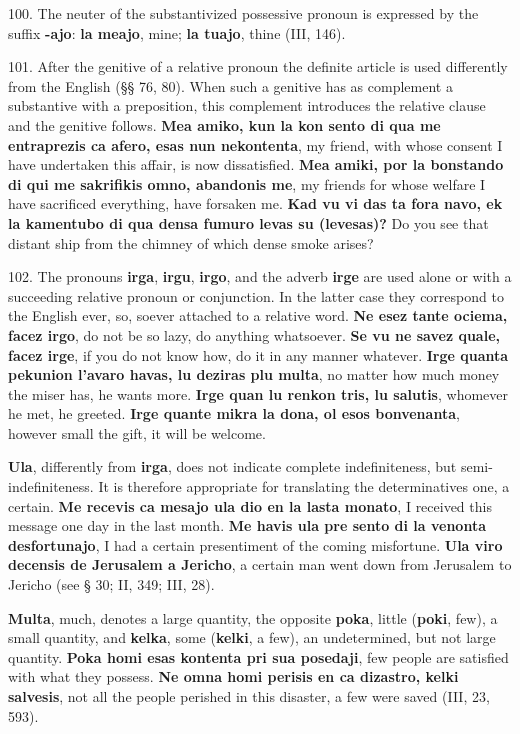 100. The neuter of the substantivized possessive pronoun is expressed by the suffix \textbf{-ajo}: \textbf{la meajo}, mine; \textbf{la tuajo}, thine (III, 146). 

101. After the genitive of a relative pronoun the definite article is used differently from the English (§§ 76, 80). When such a genitive has as complement a substantive with a preposition, this complement introduces the relative clause and the genitive follows. \textbf{Mea amiko, kun la kon sento di qua me entraprezis ca afero, esas nun nekontenta}, my friend, with whose consent I have undertaken this affair, is now dissatisfied. \textbf{Mea amiki, por la bonstando di qui me sakrifikis omno, abandonis me}, my friends for whose welfare I have sacrificed everything, have forsaken me. \textbf{Kad vu vi das ta fora navo, ek la kamentubo di qua densa fumuro levas su (levesas)?} Do you see that distant ship from the chimney of which dense smoke arises? 

102. The pronouns \textbf{irga}, \textbf{irgu}, \textbf{irgo}, and the adverb \textbf{irge} are used alone or with a succeeding relative pronoun or conjunction. In the latter case they correspond to the English ever, so, soever attached to a relative word. \textbf{Ne esez tante ociema, facez irgo}, do not be so lazy, do anything whatsoever. \textbf{Se vu ne savez quale, facez irge}, if you do not know how, do it in any manner whatever. \textbf{Irge quanta pekunion l'avaro havas, lu deziras plu multa}, no matter how much money the miser has, he wants more. \textbf{Irge quan lu renkon tris, lu salutis}, whomever he met, he greeted. \textbf{Irge quante mikra la dona, ol esos bonvenanta}, however small the gift, it will be welcome. 

\textbf{Ula}, differently from \textbf{irga}, does not indicate complete indefiniteness, but semi-indefiniteness. It is therefore appropriate for translating the determinatives one, a certain. \textbf{Me recevis ca mesajo ula dio en la lasta monato}, I received this message one day in the last month. \textbf{Me havis ula pre sento di la venonta desfortunajo}, I had a certain presentiment of the coming misfortune. \textbf{Ula viro decensis de Jerusalem a Jericho}, a certain man went down from Jerusalem to Jericho (see § 30; II, 349; III, 28). 

\textbf{Multa}, much, denotes a large quantity, the opposite \textbf{poka}, little (\textbf{poki}, few), a small quantity, and \textbf{kelka}, some (\textbf{kelki}, a few), an undetermined, but not large quantity. \textbf{Poka homi esas kontenta pri sua posedaji}, few people are satisfied with what they possess. \textbf{Ne omna homi perisis en ca dizastro, kelki salvesis}, not all the people perished in this disaster, a few were saved (III, 23, 593). 

